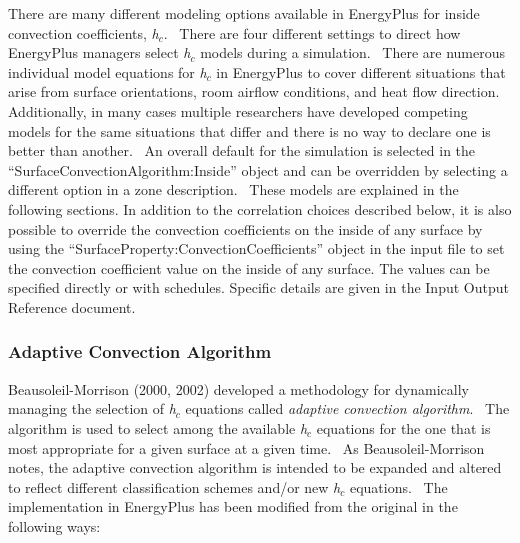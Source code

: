 There are many different modeling options available in EnergyPlus for inside convection coefficients, \emph{h\(_{c}\)}.~ There are four different settings to direct how EnergyPlus managers select \emph{h\(_{c}\)} models during a simulation.~ There are numerous individual model equations for \emph{h\(_{c}\)} in EnergyPlus to cover different situations that arise from surface orientations, room airflow conditions, and heat flow direction.~ Additionally, in many cases multiple researchers have developed competing models for the same situations that differ and there is no way to declare one is better than another.~ An overall default for the simulation is selected in the ``SurfaceConvectionAlgorithm:Inside'' object and can be overridden by selecting a different option in a zone description.~ These models are explained in the following sections. In addition to the correlation choices described below, it is also possible to override the convection coefficients on the inside of any surface by using the ``SurfaceProperty:ConvectionCoefficients'' object in the input file to set the convection coefficient value on the inside of any surface. The values can be specified directly or with schedules. Specific details are given in the Input Output Reference document.

\subsubsection{Adaptive Convection Algorithm}\label{adaptive-convection-algorithm}

Beausoleil-Morrison (2000, 2002) developed a methodology for dynamically managing the selection of \emph{h\(_{c}\)} equations called \emph{adaptive convection algorithm}.~ The algorithm is used to select among the available \emph{h\(_{c}\)} equations for the one that is most appropriate for a given surface at a given time.~ As Beausoleil-Morrison notes, the adaptive convection algorithm is intended to be expanded and altered to reflect different classification schemes and/or new \emph{h\(_{c}\)} equations.~ The implementation in EnergyPlus has been modified from the original in the following ways:

